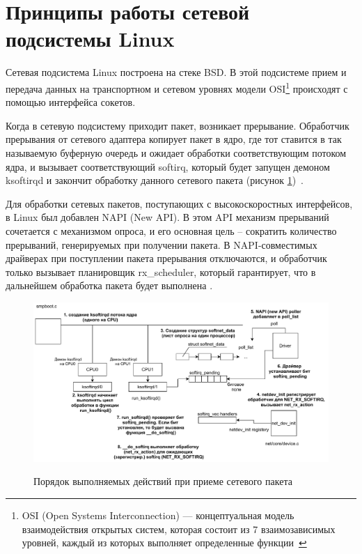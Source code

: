\section{Принципы работы сетевой подсистемы Linux}
Сетевая подсистема Linux построена на стеке BSD. В этой подсистеме прием и передача данных на транспортном и сетевом уровнях модели OSI\footnote{OSI (Open Systems Interconnection) — концептуальная модель взаимодействия открытых систем, которая состоит из 7 взаимозависимых уровней, каждый из которых выполняет определенные функции~\cite{osi}} происходят с помощью интерфейса сокетов.

Когда в сетевую подсистему приходит пакет, возникает прерывание. Обработчик прерывания от сетевого адаптера копирует пакет в ядро, где тот ставится в так называемую буферную очередь и ожидает обработки соответствующим потоком ядра, и вызывает соответствующий softirq, который будет запущен демоном ksoftirqd и закончит обработку данного сетевого пакета (рисунок \ref{img:softirq})~\cite{ryaz}. 

Для обработки сетевых пакетов, поступающих с высокоскоростных интерфейсов, в Linux был добавлен NAPI (New API). В этом API механизм прерываний сочетается с механизмом опроса, и его основная цель -- сократить количество прерываний, генерируемых при получении пакета. В NAPI-совместимых драйверах при поступлении пакета прерывания отключаются, и обработчик только вызывает планировщик rx\_scheduler, который гарантирует, что в дальнейшем обработка пакета будет выполнена \cite{b5}.

\begin{figure}[h]
	\centering
	\begin{center}
		{\includegraphics[scale=0.7]{inc/img/daemon.pdf}}
		\caption{Порядок выполняемых действий при приеме сетевого пакета}
		\label{img:softirq}
	\end{center}
\end{figure} 



